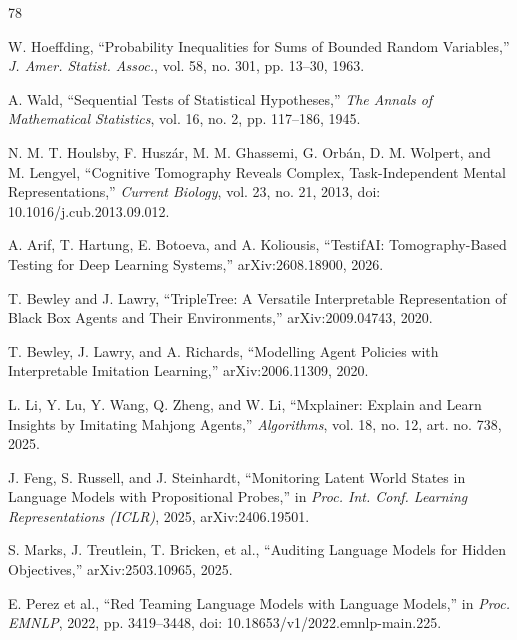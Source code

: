 
\begin{thebibliography}{78}

W. Hoeffding, ``Probability Inequalities for Sums of Bounded Random
Variables,'' \emph{J. Amer. Statist. Assoc.}, vol. 58, no. 301, pp. 13--30,
1963.

A. Wald, ``Sequential Tests of Statistical Hypotheses,'' \emph{The Annals of
Mathematical Statistics}, vol. 16, no. 2, pp. 117--186, 1945.

N. M. T. Houlsby, F. Husz{\'a}r, M. M. Ghassemi, G. Orb{\'a}n, D. M. Wolpert,
and M. Lengyel, ``Cognitive Tomography Reveals Complex, Task-Independent
Mental Representations,'' \emph{Current Biology}, vol. 23, no. 21, 2013, doi:
10.1016/j.cub.2013.09.012.

A. Arif, T. Hartung, E. Botoeva, and A. Koliousis, ``TestifAI: Tomography-Based
Testing for Deep Learning Systems,'' arXiv:2608.18900, 2026.

T. Bewley and J. Lawry, ``TripleTree: A Versatile Interpretable Representation
of Black Box Agents and Their Environments,'' arXiv:2009.04743, 2020.

T. Bewley, J. Lawry, and A. Richards, ``Modelling Agent Policies with
Interpretable Imitation Learning,'' arXiv:2006.11309, 2020.

L. Li, Y. Lu, Y. Wang, Q. Zheng, and W. Li, ``Mxplainer: Explain and Learn
Insights by Imitating Mahjong Agents,'' \emph{Algorithms}, vol. 18, no. 12,
art. no. 738, 2025.

J. Feng, S. Russell, and J. Steinhardt, ``Monitoring Latent World States in
Language Models with Propositional Probes,'' in \emph{Proc. Int. Conf.
Learning Representations (ICLR)}, 2025, arXiv:2406.19501.

S. Marks, J. Treutlein, T. Bricken, et al., ``Auditing Language Models for
Hidden Objectives,'' arXiv:2503.10965, 2025.

E. Perez et al., ``Red Teaming Language Models with Language Models,'' in
\emph{Proc. EMNLP}, 2022, pp. 3419--3448, doi: 10.18653/v1/2022.emnlp-main.225.


\end{thebibliography}
